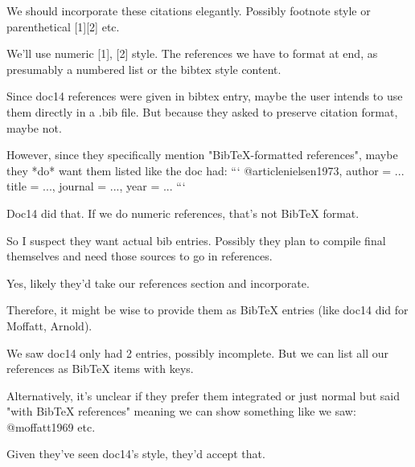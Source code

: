 \documentclass[12pt]{article}
\begin{document}
We should incorporate these citations elegantly. Possibly footnote style or parenthetical [1][2] etc.

We'll use numeric [1], [2] style. The references we have to format at end, as presumably a numbered list or the bibtex style content.

Since doc14 references were given in bibtex entry, maybe the user intends to use them directly in a .bib file. But because they asked to preserve citation format, maybe not.

However, since they specifically mention "BibTeX-formatted references", maybe they *do* want them listed like the doc had:
```
@article{nielsen1973,
 author = ...
 title = ...,
 journal = ...,
 year = ...}
```

Doc14 did that. If we do numeric references, that’s not BibTeX format.

So I suspect they want actual bib entries. Possibly they plan to compile final themselves and need those sources to go in references.

Yes, likely they'd take our references section and incorporate.

Therefore, it might be wise to provide them as BibTeX entries (like doc14 did for Moffatt, Arnold).

We saw doc14 only had 2 entries, possibly incomplete. But we can list all our references as BibTeX items with keys.

Alternatively, it's unclear if they prefer them integrated or just normal but said "with BibTeX references" meaning we can show something like we saw:
@moffatt1969 etc.

Given they've seen doc14's style, they'd accept that.
\end{document}
